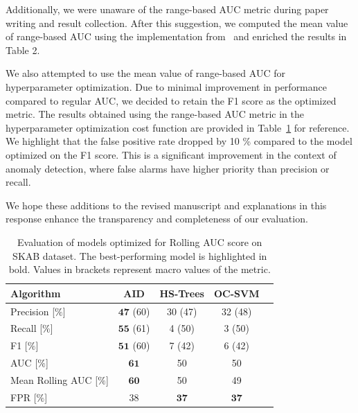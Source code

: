 \documentclass{article}
\begin{document}
\begin{enumerate}
        Additionally, we were unaware of the range-based AUC metric during paper writing and result collection. After this suggestion, we computed the mean value of range-based AUC using the implementation from~\cite{Brzezinski2017} and enriched the results in Table 2.

        We also attempted to use the mean value of range-based AUC for hyperparameter optimization. Due to minimal improvement in performance compared to regular AUC, we decided to retain the F1 score as the optimized metric. The results obtained using the range-based AUC metric in the hyperparameter optimization cost function are provided in Table~\ref{tab:perf_comp_rollauc} for reference. We highlight that the false positive rate dropped by 10 \% compared to the model optimized on the F1 score. This is a significant improvement in the context of anomaly detection, where false alarms have higher priority than precision or recall.

        We hope these additions to the revised manuscript and explanations in this response enhance the transparency and completeness of our evaluation.

\end{enumerate}


\begin{table}[htbp]
  \caption{Evaluation of models optimized for Rolling AUC score on SKAB dataset. The best-performing model is highlighted in bold. Values in brackets represent macro values of the metric.}
  \begin{center}
    \label{tab:perf_comp_rollauc}
    \begin{tabular}{|l|c|c|c|c|}
      \hline
      \textbf{Algorithm}      & AID                    & HS-Trees            & OC-SVM              \\
      \hline
      Precision [$\%$]        & $\boldsymbol{47}$ (60) & 30 (47)             & 32 (48)             \\
      \hline
      Recall [$\%$]           & $\boldsymbol{55}$ (61) & 4 (50)              & 3 (50)              \\
      \hline
      F1 [$\%$]               & $\boldsymbol{51}$ (60) & 7 (42)              & 6 (42)              \\
      \hline
      AUC [$\%$]              & $\boldsymbol{61}$      & 50                  & 50                  \\
      \hline
      Mean Rolling AUC [$\%$] & $\boldsymbol{60}$      & 50                  & 49                  \\
      \hline
      FPR [$\%$]              & 38      & $\boldsymbol{37}$                  & $\boldsymbol{37}$               \\
      \hline
    \end{tabular}
  \end{center}
\end{table}
\end{document}
